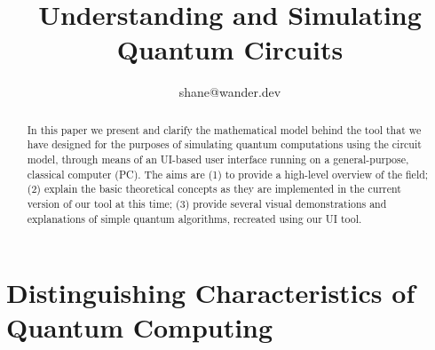 \documentclass[conference]{IEEEtran}
\begin{document}
\title{Understanding and Simulating Quantum Circuits}

\author{
shane@wander.dev
}


\maketitle

\pagestyle{plain}


\begin{abstract}
In this paper we present and clarify the mathematical model behind the tool that we
have designed for the purposes of simulating quantum computations using the circuit model, through means of an UI-based
user interface running on a general-purpose, classical computer (PC).
The aims are (1) to provide a high-level overview of the field;
(2) explain the basic theoretical concepts as they are implemented in the current version of our tool at this time;
(3) provide several visual demonstrations and explanations of simple quantum algorithms, recreated using our UI tool.
\end{abstract}


\section{Distinguishing Characteristics of Quantum Computing}

\label{sec:theQuantumModel}
\end{document}

